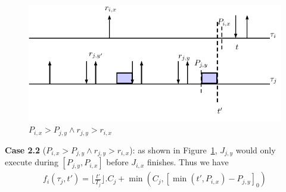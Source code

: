 \begin{figure}[h!]
 \centering
\includegraphics[scale=0.7]{Figure/C41}  
\caption{$P_{i,x}>P_{j,y}\wedge r_{j,y}> r_{i,x} $}
  \label{fig:case6}
\end{figure}

\textbf{Case 2.2} ($P_{i,x}>P_{j,y}\wedge r_{j,y}> r_{i,x}$): as shown in  Figure~\ref{fig:case6}, $J_{j,y}$ would only execute during $[P_{j,y},P_{i,x}]$ before $J_{i,x}$ finishes. Thus we have
\begin{align*}
	f_i(\tau_j,t')=\lfloor \frac{t'}{T_j}\rfloor.C_j+\min\left(C_j,[\min(t',P_{i,x})-P_{j,y}]_0\right)
\end{align*}






